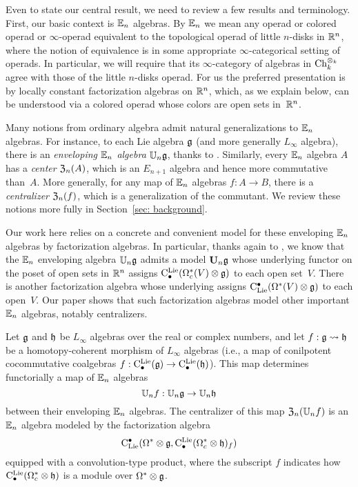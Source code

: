 \documentclass[11pt]{amsart}
\numberwithin{equation}{section}
\def\owen{\textcolor{magenta}{OG: }\textcolor{magenta}}
\begin{document}

Even to state our central result, we need to review a few results and terminology.
First, our basic context is $\mathbb E_n$ algebras.
By $\mathbb E_n$ we mean any operad or colored operad or $\infty$-operad equivalent to the topological operad of little $n$-disks in $\mathbb R^n$, where the notion of equivalence is in some appropriate $\infty$-categorical setting of operads. 
In particular, we will require that its $\infty$-category of algebras in ${\rm Ch}_k^{\otimes_k}$ agree with those of the little $n$-disks operad. 
For us the preferred presentation is by locally constant factorization algebras on $\mathbb R^n$,
which, as we explain below, can be understood via a colored operad whose colors are open sets in~$\mathbb R^n$.

Many notions from ordinary algebra admit natural generalizations to $\mathbb E_n$ algebras.
For instance, to each Lie algebra $\mathfrak g$ (and more generally $L_\infty$ algebra),
there is an {\em enveloping $\mathbb E_n$ algebra} $\mathbb U_n \mathfrak g$, thanks to \cite{Knudsen}.
Similarly, every $\mathbb E_n$ algebra $A$ has a {\em center} ${\frak Z}_n(A)$, which is an $E_{n+1}$ algebra and hence more commutative than~$A$.
More generally, for any map of $\mathbb E_n$ algebras $f: A \to B$, there is a {\em centralizer} ${\frak Z}_n(f)$, 
which is a generalization of the commutant.
We review these notions more fully in Section~\ref{sec: background}.

Our work here relies on a concrete and convenient model for these enveloping $\mathbb E_n$ algebras by factorization algebras.
In particular, thanks again to \cite{Knudsen}, 
we know that the $\mathbb E_n$ enveloping algebra $\mathbb U_n \mathfrak g$ admits a model $\mathbf U_n \mathfrak g$ whose underlying functor on the poset of open sets in $\mathbb R^n$ assigns ${\rm C}^{\rm Lie}_\bullet(\Omega_c^*(V) \otimes \mathfrak g)$ to each open set~$V$.
There is another factorization algebra whose underlying assigns ${\rm C}_{\rm Lie}^\bullet(\Omega^*(V) \otimes \mathfrak g)$ to each open~$V$.
Our paper shows that such factorization algebras model other important $\mathbb E_n$ algebras, notably centralizers.

\begin{thm}
\label{thm: centralizer}
Let $\mathfrak g$ and $\mathfrak h$ be $L_\infty$ algebras over the real or complex numbers, 
and let $f: \mathfrak g \rightsquigarrow \mathfrak h$ be a homotopy-coherent morphism of $L_\infty$ algebras
(i.e., a map of conilpotent cocommutative coalgebras $f: {\rm C}^{\rm Lie}_\bullet(\mathfrak g) \to {\rm C}^{\rm Lie}_\bullet(\mathfrak h)$).
This map determines functorially a map of $\mathbb E_n$ algebras
\[
\mathbb U_n f: \mathbb U_n \mathfrak g \to \mathbb U_n \mathfrak h
\]
between their enveloping $\mathbb E_n$ algebras.
The centralizer of this map ${\frak Z}_n(\mathbb U_n f)$ is an $\mathbb E_n$ algebra modeled by the factorization algebra 
\[
{\rm C}_{\rm Lie}^\bullet(\Omega^* \otimes \mathfrak g, {\rm C}^{\rm Lie}_\bullet(\Omega^*_c \otimes \mathfrak h)_f)
\]
equipped with a convolution-type product,
where the subscript $f$ indicates how ${\rm C}^{\rm Lie}_\bullet(\Omega^*_c \otimes \mathfrak h)$ is a module over $\Omega^* \otimes \mathfrak g$.
\end{thm}
\end{document}
